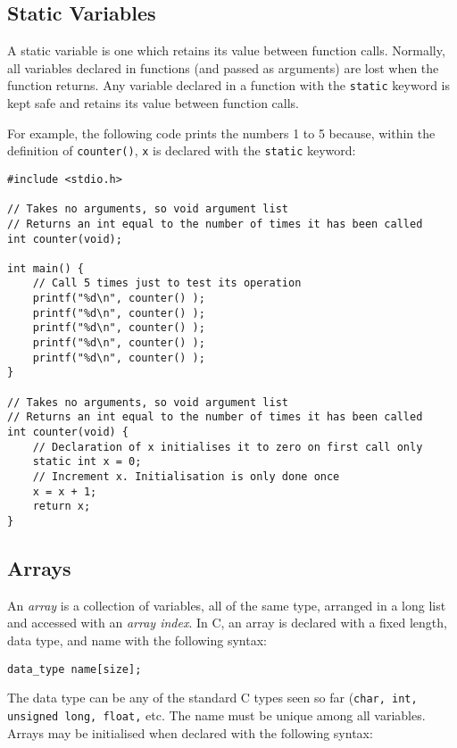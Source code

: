 \documentclass{lab}
\begin{document}
\pagebreak
\subsection{Static Variables}

A static variable is one which retains its value between function calls. Normally, all variables declared in functions (and passed as arguments) are lost when the function returns. Any variable declared in a function with the \texttt{static} keyword is kept safe and retains its value between function calls.

For example, the following code prints the numbers 1 to 5 because, within the definition of \texttt{counter()}, \texttt{x} is declared with the \texttt{static} keyword:

\begin{lstlisting}[style=CStyle]
#include <stdio.h>

// Takes no arguments, so void argument list
// Returns an int equal to the number of times it has been called
int counter(void); 

int main() {
	// Call 5 times just to test its operation
	printf("%d\n", counter() );
	printf("%d\n", counter() );
	printf("%d\n", counter() );
	printf("%d\n", counter() );
	printf("%d\n", counter() );
}
	
// Takes no arguments, so void argument list
// Returns an int equal to the number of times it has been called
int counter(void) {
	// Declaration of x initialises it to zero on first call only
	static int x = 0;
	// Increment x. Initialisation is only done once
	x = x + 1;
	return x;
}
\end{lstlisting}

\pagebreak
\subsection{Arrays}

An \textit{array} is a collection of variables, all of the same type, arranged in a long list and accessed with an \textit{array index}. In C, an array is declared with a fixed length, data type, and name with the following syntax:
\begin{lstlisting}[style=Ctable]
data_type name[size];
\end{lstlisting}

The data type can be any of the standard C types seen so far (\texttt{char, int, unsigned long, float,} etc. The name must be unique among all variables. Arrays may be initialised when declared with the following syntax:
\end{document}
